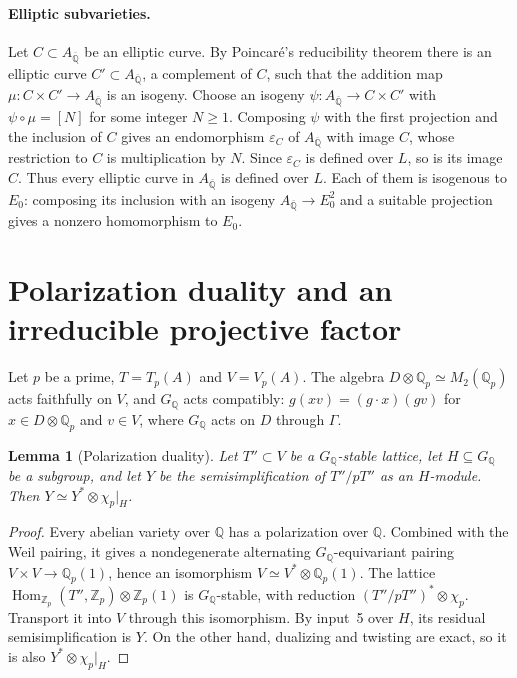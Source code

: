 \documentclass[11pt]{article}
\newtheorem{lemma}{Lemma}
\newcommand{\Q}{\mathbb Q}
\newcommand{\Z}{\mathbb Z}
\DeclareMathOperator{\Hom}{Hom}
\begin{document}
\paragraph{Elliptic subvarieties.} Let \(C\subset A_{\overline{\Q}}\)
be an elliptic curve. By Poincar\'e's reducibility theorem there is an
elliptic curve \(C'\subset A_{\overline{\Q}}\), a complement of \(C\),
such that the addition map \(\mu:C\times C'\to A_{\overline{\Q}}\) is
an isogeny. Choose an isogeny \(\psi:A_{\overline{\Q}}\to C\times C'\)
with \(\psi\circ\mu=[N]\) for some integer \(N\ge1\). Composing
\(\psi\) with the first projection and the inclusion of \(C\) gives an
endomorphism \(\varepsilon_C\) of \(A_{\overline{\Q}}\) with image
\(C\), whose restriction to \(C\) is multiplication by \(N\). Since
\(\varepsilon_C\) is defined over \(L\), so is its image \(C\). Thus
every elliptic curve in \(A_{\overline{\Q}}\) is defined over \(L\).
Each of them is isogenous to \(E_0\): composing its inclusion with an
isogeny \(A_{\overline{\Q}}\to E_0^2\) and a suitable projection gives
a nonzero homomorphism to \(E_0\).

\section{Polarization duality and an irreducible projective factor}
\label{sec:cyclotomic}

Let \(p\) be a prime, \(T=T_p(A)\) and \(V=V_p(A)\). The algebra
\(D\otimes\Q_p\simeq M_2(\Q_p)\) acts faithfully on \(V\), and
\(G_{\Q}\) acts compatibly: \(g(xv)=(g\cdot x)(gv)\) for
\(x\in D\otimes\Q_p\) and \(v\in V\), where \(G_{\Q}\) acts on \(D\)
through \(\Gamma\).

\begin{lemma}[Polarization duality]\label{lem:duality}
Let \(T''\subset V\) be a \(G_{\Q}\)-stable lattice, let
\(H\subseteq G_{\Q}\) be a subgroup, and let \(Y\) be the
semisimplification of \(T''/pT''\) as an \(H\)-module. Then
\(Y\simeq Y^*\otimes\chi_p|_H\).
\end{lemma}

\begin{proof}
Every abelian variety over \(\Q\) has a polarization over \(\Q\).
Combined with the Weil pairing, it gives a nondegenerate alternating
\(G_{\Q}\)-equivariant pairing \(V\times V\to\Q_p(1)\), hence an
isomorphism \(V\simeq V^*\otimes\Q_p(1)\). The lattice
\(\Hom_{\Z_p}(T'',\Z_p)\otimes\Z_p(1)\) is \(G_{\Q}\)-stable, with
reduction \((T''/pT'')^*\otimes\chi_p\). Transport it into \(V\)
through this isomorphism. By input~5 over \(H\), its residual
semisimplification is \(Y\). On the other hand, dualizing and twisting
are exact, so it is also \(Y^*\otimes\chi_p|_H\).
\end{proof}
\end{document}
